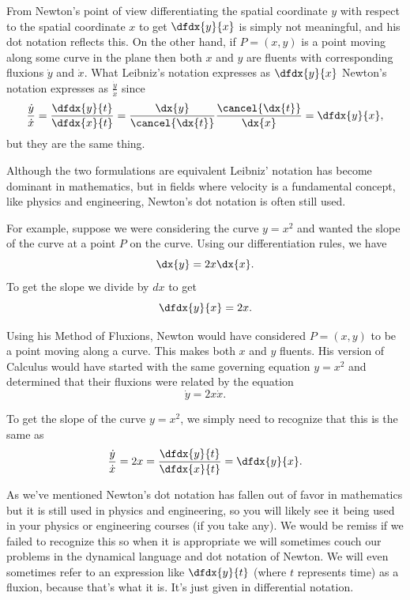 From Newton's point of view differentiating the spatial coordinate $y$
with respect to the spatial coordinate $x$ to get $\dfdx{y}{x}$ is
simply not meaningful, and his dot notation reflects this.  On the
other hand, if $P=(x,y)$ is a point moving along some curve in the
plane then both $x$ and $y$ are fluents with corresponding fluxions
$\dot{y}$ and $\dot{x}$. What Leibniz's notation expresses as
$\dfdx{y}{x}$ Newton's notation expresses as $\frac{\dot{y}}{\dot{x}}$
since
$$
\frac{\dot{y}}{\dot{x}} = \frac{\dfdx{y}{t}}{\dfdx{x}{t}}=
\frac{\dx{y}}{\cancel{\dx{t}}}\frac{\cancel{\dx{t}}}{\dx{x}}=\dfdx{y}{x},
$$
but they are the same thing.
                            
Although the two formulations are equivalent Leibniz' notation has
become dominant in mathematics, but  in fields where velocity is a
fundamental concept, like physics and engineering, Newton's dot
notation is often still used. 

For example, suppose we were considering the curve $y=x^2$ and wanted
the slope of the curve at a point $P$ on the curve.  Using our
differentiation rules, we have
$$
\dx{y}=2x\dx{x}.
$$
To get the slope we divide by $d{x}$ to get
$$
\dfdx{y}{x}=2x.
$$

Using his Method of Fluxions, Newton would have considered $P=(x,y)$
to be a point moving along a curve. This makes both $x$ and $y$
fluents.  His version of  Calculus would have started with the same
governing equation $y=x^2$ and determined that their fluxions were
related by the equation
$$
\dot{y}=2x\dot{x}.
$$

To get the slope of the curve $y=x^2$, we simply  need to recognize
that this is the same as
$$\frac{\dot{y}}{\dot{x}}=2x=\frac{\dfdx{y}{t}}{\dfdx{x}{t}}=\dfdx{y}{x}.$$

As we've mentioned Newton's dot notation has fallen out of favor in
mathematics but it is still used in physics and engineering, so you
will likely see it being used in your physics or engineering courses
(if you take any). We would be remiss if we failed to recognize this
so when it is appropriate we will sometimes couch our problems in the 
dynamical language and dot notation of Newton. We will even
sometimes refer to an expression like $\dfdx{y}{t}$ (where $t$
represents time) as a fluxion, because that's what it is. It's just
given in differential notation.

